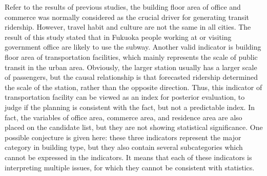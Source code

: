 \documentclass[utf8]{article}
\begin{document}
%
Refer to the results of previous studies, the building floor area of office and commerce was normally considered as the crucial driver for generating transit ridership. However, travel habit and culture are not the same in all cities. The result of this study stated that in Fukuoka people working at or visiting government office are likely to use the subway. Another valid indicator is building floor area of transportation facilities, which mainly represents the scale of public transit in the urban area. Obviously, the larger station usually has a larger scale of passengers, but the causal relationship is that forecasted ridership determined the scale of the station, rather than the opposite direction. Thus, this indicator of transportation facility can be viewed as an index for posterior evaluation, to judge if the planning is consistent with the fact, but not a predictable index. In fact, the variables of office area, commerce area, and residence area are also placed on the candidate list, but they are not showing statistical significance. One possible conjecture is given here: these three indicators represent the major category in building type, but they also contain several subcategories which cannot be expressed in the indicators. It means that each of these indicators is interpreting multiple issues, for which they cannot be consistent with statistics.
\end{document}
